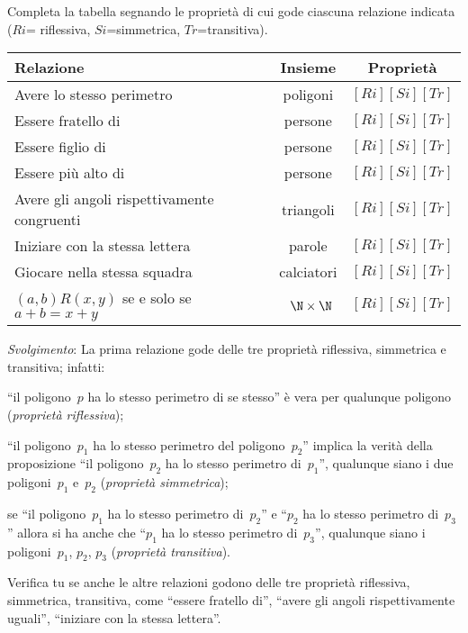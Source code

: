  \begin{esempio}

Completa la tabella segnando le proprietà di cui gode ciascuna relazione 
indicata (\(Ri\)= riflessiva, \(Si\)=simmetrica, \(Tr\)=transitiva).

\begin{center}
\begin{tabular}{lcc}
\toprule
Relazione & Insieme & Proprietà \\
\midrule
Avere lo stesso perimetro & poligoni & \([Ri][Si][Tr]\) \\
Essere fratello di & persone & \([Ri][Si][Tr]\) \\
Essere figlio di & persone & \([Ri][Si][Tr]\) \\
Essere più alto di & persone & \([Ri][Si][Tr]\) \\
Avere gli angoli rispettivamente congruenti & triangoli & \([Ri][Si][Tr]\) \\
Iniziare con la stessa lettera & parole & \([Ri][Si][Tr]\) \\
Giocare nella stessa squadra & calciatori & \([Ri][Si][Tr]\) \\
\((a,b) R (x,y)\) se e solo se~\(a+b=x+y\) & ~\(\N \times \N\) & 
\([Ri][Si][Tr]\) 
\\
\bottomrule
\end{tabular}
\end{center}

\emph{Svolgimento}: La prima relazione gode delle tre proprietà riflessiva, 
simmetrica e transitiva; infatti:

\begin{itemize*}
\item ``il poligono~\(p\) ha lo stesso perimetro di se stesso'' è vera per 
qualunque poligono (\emph{proprietà riflessiva});
\item ``il poligono~\(p_1\) ha lo stesso perimetro del poligono~\(p_2\)'' 
implica la 
verità della proposizione ``il
poligono~\(p_2\) ha lo stesso perimetro di~\(p_1\)'', qualunque siano i due 
poligoni~\(p_1\) e~\(p_2\) (\emph{proprietà
simmetrica});
\item se ``il poligono~\(p_1\) ha lo stesso perimetro di~\(p_2\)'' e 
``\(p_2\) 
ha lo 
stesso perimetro di~\(p_3\)'' allora si ha anche che ``\(p_1\) ha lo stesso
perimetro di~\(p_3\)'', qualunque siano i poligoni~\(p_1\), \(p_2\), \(p_3\) 
(\emph{proprietà transitiva}).
\end{itemize*}

Verifica tu se anche le altre relazioni godono delle tre proprietà 
riflessiva, 
simmetrica, transitiva, come
``essere fratello di'', ``avere gli angoli rispettivamente uguali'', 
``iniziare 
con la stessa lettera''.
 \end{esempio}


